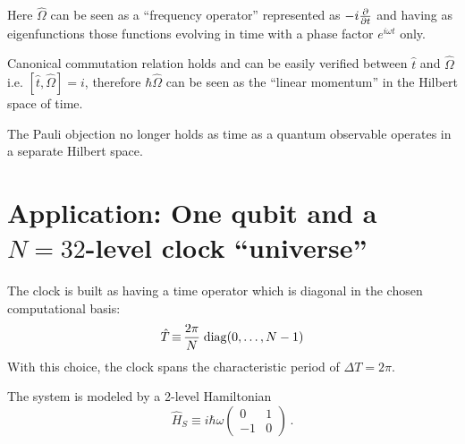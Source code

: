 \documentclass[a0,portrait]{a0poster}
\newcommand{\hilb}[1]{\mathcal{#1}}       %
\DeclareMathOperator*{\repr}{\equiv}      %
\newcommand{\smallback}{\hspace{-0.115em}}
\newcommand{\dket}[1]{\left.\left| #1 \right\rangle\smallback\right\rangle}
\begin{document}
\begin{multicols}{2}
Here $\hat{\Omega}$ can be seen as a ``frequency operator''
represented as $-i\pdv{t}$ and having as eigenfunctions
those functions evolving in time with a phase factor $e^{i \omega t}$ only.

Canonical commutation relation holds and can be easily verified
between $\hat{t}$ and $\hat{\Omega}$
i.e. $[\hat{t}, \hat{\Omega}] = i$,
therefore $\hbar\hat{\Omega}$ can be seen as the ``linear momentum''
in the Hilbert space of time.

The Pauli objection no longer holds as time as a quantum observable operates in a separate Hilbert space.



\section*{Application: One qubit and a $N=32$-level clock ``universe''}

The clock is built as having a time operator which is diagonal in the
chosen computational basis:
\[
  \hat{T} \repr \frac{2\pi}{N} \,\;\! \mathrm{diag}\qty(0, \dots, N-1)
\]
With this choice, the clock spans the characteristic period of $\Delta T = 2\pi$.

The system is modeled by a 2-level Hamiltonian
\[
  \hat{H}_S \repr
  i \hbar \omega
  \begin{pmatrix}
    0   & 1   \\
    -1  & 0
  \end{pmatrix}
  \, \text{.}
\]


\end{multicols}
\end{document}
